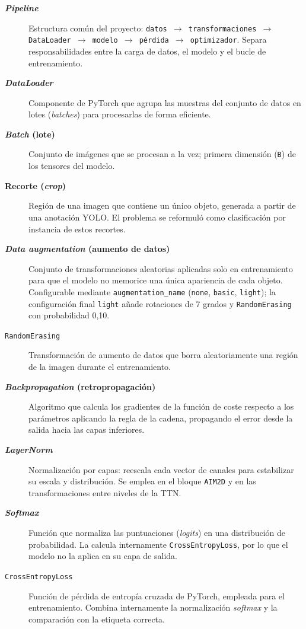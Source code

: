 \begin{description}
  \item[\textbf{\textit{Pipeline}}] Estructura común del proyecto: \texttt{datos $\to$ transformaciones $\to$ DataLoader $\to$ modelo $\to$ pérdida $\to$ optimizador}. Separa responsabilidades entre la carga de datos, el modelo y el bucle de entrenamiento.
  \item[\textbf{\textit{DataLoader}}] Componente de PyTorch que agrupa las muestras del conjunto de datos en lotes (\textit{batches}) para procesarlas de forma eficiente.
  \item[\textbf{\textit{Batch} (lote)}] Conjunto de imágenes que se procesan a la vez; primera dimensión (\texttt{B}) de los tensores del modelo.
  \item[\textbf{Recorte (\textit{crop})}] Región de una imagen que contiene un único objeto, generada a partir de una anotación YOLO. El problema se reformuló como clasificación por instancia de estos recortes.
  \item[\textbf{\textit{Data augmentation} (aumento de datos)}] Conjunto de transformaciones aleatorias aplicadas solo en entrenamiento para que el modelo no memorice una única apariencia de cada objeto. Configurable mediante \texttt{augmentation\_name} (\texttt{none}, \texttt{basic}, \texttt{light}); la configuración final \texttt{light} añade rotaciones de 7 grados y \texttt{RandomErasing} con probabilidad 0{,}10.
  \item[\texttt{RandomErasing}] Transformación de aumento de datos que borra aleatoriamente una región de la imagen durante el entrenamiento.
  \item[\textbf{\textit{Backpropagation} (retropropagación)}] Algoritmo que calcula los gradientes de la función de coste respecto a los parámetros aplicando la regla de la cadena, propagando el error desde la salida hacia las capas inferiores.
  \item[\textbf{\textit{LayerNorm}}] Normalización por capas: reescala cada vector de canales para estabilizar su escala y distribución. Se emplea en el bloque \texttt{AIM2D} y en las transformaciones entre niveles de la TTN.
  \item[\textbf{\textit{Softmax}}] Función que normaliza las puntuaciones (\textit{logits}) en una distribución de probabilidad. La calcula internamente \texttt{CrossEntropyLoss}, por lo que el modelo no la aplica en su capa de salida.
  \item[\texttt{CrossEntropyLoss}] Función de pérdida de entropía cruzada de PyTorch, empleada para el entrenamiento. Combina internamente la normalización \textit{softmax} y la comparación con la etiqueta correcta.

\end{description}
